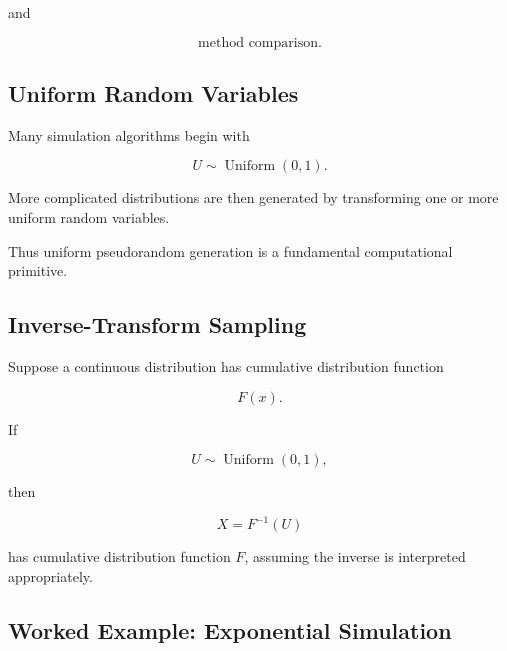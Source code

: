 and

\[
\boxed{
\text{method comparison}.
}
\]

\subsection{Uniform Random Variables}
\label{subsec:uniform-random-generation}

Many simulation algorithms begin with

\[
\boxed{
U\sim\operatorname{Uniform}(0,1).
}
\]

More complicated distributions are then generated by transforming one or
more uniform random variables.

Thus uniform pseudorandom generation is a fundamental computational
primitive.

\subsection{Inverse-Transform Sampling}
\label{subsec:inverse-transform-sampling}

Suppose a continuous distribution has cumulative distribution function

\[
F(x).
\]

If

\[
U\sim\operatorname{Uniform}(0,1),
\]

then

\[
\boxed{
X
=
F^{-1}(U)
}
\]

has cumulative distribution function \(F\), assuming the inverse is
interpreted appropriately.

\subsection{Worked Example: Exponential Simulation}
\label{subsec:worked-exponential-simulation}

